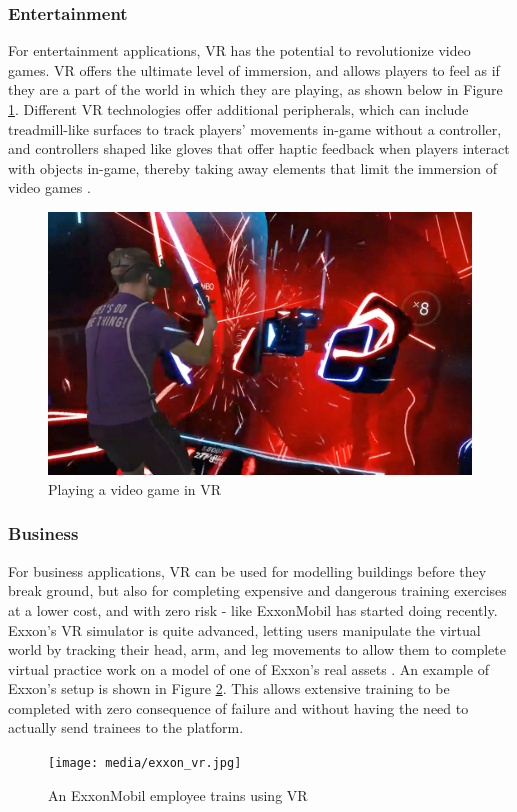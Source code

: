 \subsubsection{Entertainment}
For entertainment applications, VR has the potential to revolutionize video games.
VR offers the ultimate level of immersion, and allows players to feel as if they
are a part of the world in which they are playing, as shown below in Figure \ref{vr:saber}.
Different VR technologies offer additional peripherals, which can include treadmill-like
surfaces to track players' movements in-game without a controller, and controllers
shaped like gloves that offer haptic feedback when players interact with objects in-game,
thereby taking away elements that limit the immersion of video games \cite{vr_peripherals}.

\begin{figure}[h]
    \centering
    \includegraphics[width=.5\linewidth]{media/beatsaber_vr.jpg}
    \caption{Playing a video game in VR \cite{beatsaber_cite}}
    \label{vr:saber}
\end{figure}

\subsubsection{Business}
For business applications, VR can be used for modelling buildings before they break
ground, but also for completing expensive and dangerous training exercises at a lower
cost, and with zero risk - like ExxonMobil has started doing recently.
Exxon's VR simulator is quite advanced, letting users manipulate the 
virtual world by tracking their head, arm, and leg movements to allow them to 
complete virtual practice work on a model of one of Exxon's real assets \cite{exxon_vr}.
An example of Exxon's setup is shown in Figure \ref{vr:exxon}.
This allows extensive training to be completed with zero consequence of failure and
without having the need to actually send trainees to the platform.

\begin{figure}[h]
    \centering
    \texttt{[image: media/exxon\_vr.jpg]}
    \caption{An ExxonMobil employee trains using VR \cite{exxon_vr}}
    \label{vr:exxon}
\end{figure}

